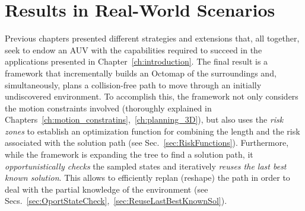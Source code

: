 
\chapter{Results in Real-World Scenarios}
\label{ch:applications} %



\ifpdf
    \graphicspath{{6_applications/figures/PNG/}{6_applications/figures/PDF/}{6_applications/figures/}}
\else
    \graphicspath{{6_applications/figures/EPS/}{6_applications/figures/}}
\fi


Previous chapters presented different strategies and extensions that, all
together, seek to endow an \ac{AUV} with the capabilities required to succeed in
the applications presented in Chapter~\ref{ch:introduction}. The final result is
a framework that incrementally builds an Octomap of the surroundings and,
simultaneously, plans a collision-free path to move through an initially
undiscovered environment. To accomplish this, the framework not only considers
the motion constraints involved (thoroughly explained in
Chapters~\ref{ch:motion_constratins},~\ref{ch:planning_3D}), but also uses
the \textit{risk zones} to establish an optimization function for combining the
length and the risk associated with the solution path (see
Sec.~\ref{sec:RiskFunctions}). Furthermore, while the framework is expanding the
tree to find a solution path, it \textit{opportunistically checks} the sampled
states and iteratively \textit{reuses the last best known solution}. This allows
to efficiently replan (reshape) the path in order to deal with the partial
knowledge of the environment (see
Secs.~\ref{sec:OportStateCheck},~\ref{sec:ReuseLastBestKnownSol}).


